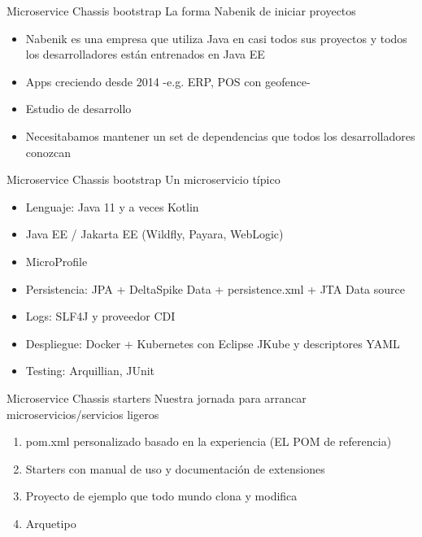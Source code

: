 \documentclass[aspectratio=169]{beamer}
\begin{document}
\begin{frame}{Microservice Chassis bootstrap}
La forma Nabenik de iniciar proyectos
\begin{itemize}
\item Nabenik es una empresa que utiliza Java en casi todos sus proyectos y todos los desarrolladores están entrenados en Java EE
\item Apps creciendo desde 2014 -e.g. ERP, POS con geofence-
\item Estudio de desarrollo
\item Necesitabamos mantener un set de dependencias que todos los desarrolladores conozcan
\end{itemize}
\end{frame}

\begin{frame}{Microservice Chassis bootstrap}
Un microservicio típico
\begin{itemize}
\item Lenguaje: Java 11 y a veces Kotlin
\item Java EE / Jakarta EE (Wildfly, Payara, WebLogic)
\item MicroProfile
\item Persistencia: JPA + DeltaSpike Data + persistence.xml + JTA Data source
\item Logs: SLF4J y proveedor CDI
\item Despliegue: Docker + Kubernetes con Eclipse JKube y descriptores YAML
\item Testing: Arquillian, JUnit
\end{itemize}
\end{frame}


\begin{frame}{Microservice Chassis starters}
Nuestra jornada para arrancar microservicios/servicios ligeros
\begin{enumerate}
\item pom.xml personalizado basado en la experiencia (EL POM de referencia)
\item Starters con manual de uso y documentación de extensiones 
\item Proyecto de ejemplo que todo mundo clona y modifica
\item Arquetipo
\end{enumerate}
\end{frame}
\end{document}
